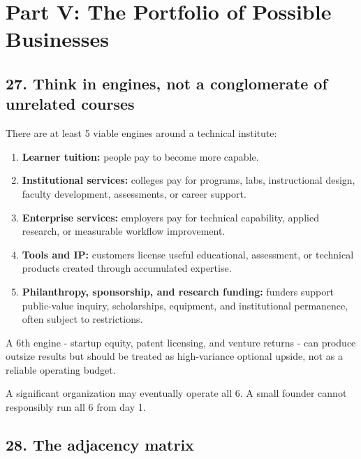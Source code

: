 
\section*{Part V: The Portfolio of Possible Businesses}

\subsection{27. Think in engines, not a conglomerate of unrelated courses}

There are at least 5 viable engines around a technical institute:

\begin{enumerate}[leftmargin=*,itemsep=1.5pt]
  \item \textbf{Learner tuition:} people pay to become more capable.
  \item \textbf{Institutional services:} colleges pay for programs, labs, instructional design, faculty development, assessments, or career support.
  \item \textbf{Enterprise services:} employers pay for technical capability, applied research, or measurable workflow improvement.
  \item \textbf{Tools and IP:} customers license useful educational, assessment, or technical products created through accumulated expertise.
  \item \textbf{Philanthropy, sponsorship, and research funding:} funders support public-value inquiry, scholarships, equipment, and institutional permanence, often subject to restrictions.
\end{enumerate}

A 6th engine - startup equity, patent licensing, and venture returns - can produce outsize results but should be treated as high-variance optional upside, not as a reliable operating budget.

A significant organization may eventually operate all 6. A small founder cannot responsibly run all 6 from day 1.

\subsection{28. The adjacency matrix}

